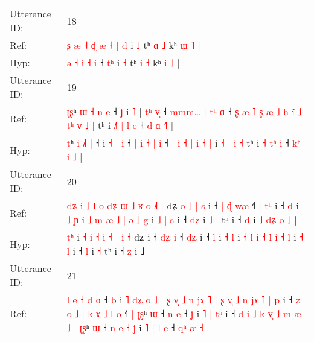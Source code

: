 \documentclass[10pt]{article}
\DeclareRobustCommand{\hl}[1]{{\textcolor{red}{#1}}}
\begin{document}
\begin{longtable}{ll}
 \\
\midrule
Utterance ID: & 18 \\
Ref: & \hl{ʂ} \hl{æ} \hl{˧} \hl{ɖ} \hl{æ} ˧ \hl{|}\hl{ }\hl{d} i \hl{˩} tʰ \hl{ɑ} \hl{˩} kʰ \hl{ɯ} \hl{˥} |
 \\
Hyp: & \hl{ə} \hl{˧} \hl{i} \hl{˧} \hl{i} ˧ \hl{}\hl{t}\hl{ʰ} i \hl{˧} tʰ \hl{i} \hl{˧} kʰ \hl{i} \hl{˩} |
 \\
\midrule
Utterance ID: & 19 \\
Ref: & \hl{ʈ}\hl{ʂ}ʰ \hl{ɯ} \hl{˧}\hl{ }\hl{n} \hl{e} ˧\hl{ }\hl{ʝ} i \hl{˥} |\hl{ }\hl{t}\hl{ʰ} \hl{v}\hl{̩} ˧ \hl{m}\hl{m}\hl{m}\hl{…} \hl{|} \hl{t}\hl{ʰ} \hl{ɑ} ˧ \hl{ʂ} \hl{æ} \hl{˥} \hl{ʂ} \hl{æ} \hl{˩} \hl{h} i\hl{̃}\hl{ }\hl{˩} \hl{t}\hl{ʰ} \hl{v}\hl{̩} \hl{˩} \hl{|} tʰ i \hl{˩}\hl{˥} \hl{|}\hl{ }\hl{l} \hl{e} ˧ \hl{}\hl{d} \hl{ɑ} \hl{˧}\hl{˥} |
 \\
Hyp: & \hl{}\hl{t}ʰ \hl{i} \hl{}\hl{˩}\hl{˥} \hl{|} ˧\hl{}\hl{} i \hl{˧} |\hl{}\hl{}\hl{} \hl{}\hl{i} ˧ \hl{}\hl{|}\hl{ }\hl{i} \hl{˧} \hl{}\hl{|} \hl{i} ˧ \hl{|} \hl{i} \hl{˧} \hl{|} \hl{i} \hl{˧} \hl{|} i\hl{}\hl{}\hl{} \hl{}\hl{˧} \hl{}\hl{|} \hl{i} \hl{˧} tʰ i \hl{}\hl{˧} \hl{}\hl{t}\hl{ʰ} \hl{i} ˧ \hl{k}\hl{ʰ} \hl{i} \hl{}\hl{˩} |
 \\
\midrule
Utterance ID: & 20 \\
Ref: & \hl{d}\hl{ʑ} i\hl{ }\hl{˩}\hl{ }\hl{l} \hl{o} \hl{d}\hl{ʑ} \hl{ɯ} \hl{˩} \hl{ʁ} \hl{o} \hl{˩}\hl{˥} \hl{|} dʑ\hl{ }\hl{o}\hl{ }\hl{˩}\hl{ }\hl{|}\hl{ }\hl{s} i ˧ \hl{|}\hl{ }\hl{ɖ} \hl{w}\hl{æ} ˧\hl{˥}\hl{ }\hl{|} \hl{t}\hl{ʰ} i ˧ \hl{d} i \hl{˩} \hl{ɲ} i \hl{˩} \hl{m} \hl{æ} \hl{˩} \hl{|} \hl{ə} \hl{˩} \hl{g} i\hl{ }\hl{˩} \hl{|} \hl{s} i ˧ \hl{d}\hl{z} i\hl{ }\hl{˩} \hl{|} tʰ i ˧ \hl{d} i\hl{ }\hl{˩}\hl{ }\hl{d}\hl{ʑ}\hl{ }\hl{o} ˩ |
 \\
Hyp: & \hl{t}\hl{ʰ} i\hl{}\hl{}\hl{}\hl{} \hl{˧} \hl{}\hl{i} \hl{˧} \hl{i} \hl{˧} \hl{|} \hl{}\hl{i} \hl{˧} dʑ\hl{}\hl{}\hl{}\hl{}\hl{}\hl{}\hl{}\hl{} i ˧ \hl{}\hl{d}\hl{ʑ} \hl{}\hl{i} ˧\hl{}\hl{}\hl{} \hl{d}\hl{ʑ} i ˧ \hl{l} i \hl{˧} \hl{l} i \hl{˧} \hl{l} \hl{i} \hl{˧} \hl{l} \hl{i} \hl{˧} \hl{l} i\hl{}\hl{} \hl{˧} \hl{l} i ˧ \hl{}\hl{l} i\hl{}\hl{} \hl{˧} tʰ i ˧ \hl{z} i\hl{}\hl{}\hl{}\hl{}\hl{}\hl{}\hl{} ˩ |
 \\
\midrule
Utterance ID: & 21 \\
Ref: & \hl{l}\hl{ }\hl{e} \hl{˧} \hl{d} \hl{ɑ} ˧\hl{ }\hl{b} i\hl{ }\hl{˥} \hl{d}\hl{ʑ} \hl{o}\hl{ }\hl{˩} \hl{|} \hl{ʂ} \hl{v}\hl{̩} \hl{˩} \hl{n} \hl{j}\hl{ɤ}\hl{ }\hl{˥} \hl{|} \hl{ʂ} \hl{v}\hl{̩} \hl{˩} \hl{n} \hl{j}\hl{ɤ} \hl{˥} \hl{|} \hl{}\hl{p} i ˧\hl{ }\hl{z}\hl{ }\hl{o} \hl{˩}\hl{ }\hl{|} \hl{k} \hl{ɤ} \hl{˩}\hl{ }\hl{l} \hl{o} ˧\hl{˥}\hl{ }\hl{|} \hl{ʈ}\hl{ʂ}ʰ \hl{ɯ} ˧ \hl{n} \hl{e} ˧ \hl{ʝ} i\hl{ }\hl{˥} \hl{|} \hl{t}\hl{ʰ} i ˧\hl{ }\hl{d}\hl{ }\hl{i} \hl{˩}\hl{ }\hl{k} \hl{v}\hl{̩} \hl{˩} \hl{m}\hl{ }\hl{æ} \hl{˩} \hl{|} \hl{ʈ}\hl{ʂ}ʰ \hl{ɯ} ˧\hl{ }\hl{n}\hl{ }\hl{e} \hl{˧}\hl{ }\hl{ʝ} i \hl{˥} \hl{|}\hl{ }\hl{l} \hl{e} ˧ \hl{q}\hl{ʰ} \hl{æ} \hl{˧} |

\end{longtable}
\end{document}

